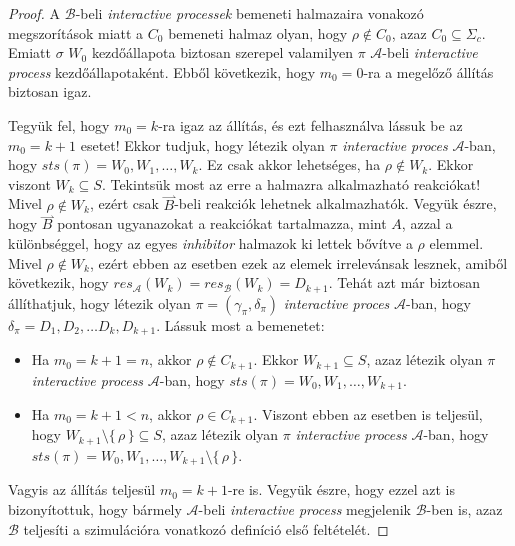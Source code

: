 \documentclass[12pt]{article}
\theoremstyle{definition}
\theoremstyle{remark}
\theoremstyle{plain}
\theoremstyle{plain}
\newcommand{\forwardhat}{\overset{\rightharpoonup}}
\newcommand{\res}{\textit{res}}
\begin{document}
\begin{proof}
        A $\mathscr{B}$-beli \textit{interactive processek} bemeneti halmazaira vonakozó megszorítások miatt a $C_{0}$ bemeneti halmaz olyan, hogy $\rho \notin C_{0}$, azaz $C_{0} \subseteq \Sigma_{c}$. Emiatt $\sigma$ $W_{0}$ kezdőállapota biztosan szerepel valamilyen $\pi$ $\mathscr{A}$-beli \textit{interactive process} kezdőállapotaként. Ebből következik, hogy $m_{0} = 0$-ra a megelőző állítás biztosan igaz.
        
        Tegyük fel, hogy $m_{0} = k$-ra igaz az állítás, és ezt felhasználva lássuk be az $m_{0} = k + 1$ esetet! Ekkor tudjuk, hogy létezik olyan $\pi$ \textit{interactive proces} $\mathscr{A}$-ban, hogy $\textit{sts}(\pi) = W_{0}, W_{1}, \ldots, W_{k}$. Ez csak akkor lehetséges, ha $\rho \notin W_{k}$. Ekkor viszont $W_{k} \subseteq S$. Tekintsük most az erre a halmazra alkalmazható reakciókat! Mivel $\rho \notin W_{k}$, ezért csak $\forwardhat B$-beli reakciók lehetnek alkalmazhatók. Vegyük észre, hogy $\forwardhat B$ pontosan ugyanazokat a reakciókat tartalmazza, mint $A$, azzal a különbséggel, hogy az egyes \textit{inhibitor} halmazok ki lettek bővítve a $\rho$ elemmel. Mivel $\rho \notin W_{k}$, ezért ebben az esetben ezek az elemek irrelevánsak lesznek, amiből következik, hogy $\res_{\mathscr{A}}(W_{k}) = \res_{\mathscr{B}}(W_{k}) = D_{k + 1}$. Tehát azt már biztosan állíthatjuk, hogy létezik olyan $\pi = (\gamma_{\pi}, \delta_{\pi})$ \textit{interactive proces} $\mathscr{A}$-ban, hogy $\delta_{\pi} = D_{1}, D_{2}, \ldots D_{k}, D_{k + 1}$. Lássuk most a bemenetet:
        \begin{itemize}
            \item
            Ha $m_{0} = k + 1 = n$, akkor $\rho \notin C_{k + 1}$. Ekkor $W_{k + 1} \subseteq S$, azaz létezik olyan $\pi$ \textit{interactive process} $\mathscr{A}$-ban, hogy $\textit{sts}(\pi)=W_{0}, W_{1}, \ldots, W_{k + 1}$.

            \item
            Ha $m_{0} = k + 1 < n$, akkor $\rho \in C_{k + 1}$. Viszont ebben az esetben is teljesül, hogy $W_{k + 1} \setminus \{\,\rho\,\}\subseteq S$, azaz létezik olyan $\pi$ \textit{interactive process} $\mathscr{A}$-ban, hogy $\textit{sts}(\pi)=W_{0}, W_{1}, \ldots, W_{k + 1} \setminus \{\,\rho\,\}$.
        \end{itemize}
        Vagyis az állítás teljesül $m_{0} = k + 1$-re is. Vegyük észre, hogy ezzel azt is bizonyítottuk, hogy bármely $\mathscr{A}$-beli \textit{interactive process} megjelenik $\mathscr{B}$-ben is, azaz $\mathscr{B}$ teljesíti a szimulációra vonatkozó definíció első feltételét.
        

\end{proof}
\end{document}
